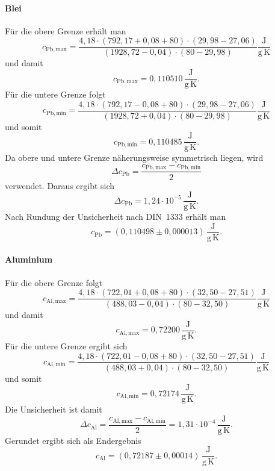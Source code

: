 \documentclass{report}
\begin{document}
\paragraph{Blei}
\noindent
Für die obere Grenze erhält man
\[
c_{\mathrm{Pb,max}}
=
\frac{
4{,}18
\cdot
(792{,}17+0{,}08+80)
\cdot
(29{,}98-27{,}06)
}{
(1928{,}72-0{,}04)
\cdot
(80-29{,}98)
}
\frac{\mathrm{J}}{\mathrm{g\,K}}
\]
\noindent
und damit
\[
c_{\mathrm{Pb,max}}
=
0{,}110510\,\frac{\mathrm{J}}{\mathrm{g\,K}}.
\]
\noindent
Für die untere Grenze folgt
\[
c_{\mathrm{Pb,min}}
=
\frac{
4{,}18
\cdot
(792{,}17-0{,}08+80)
\cdot
(29{,}98-27{,}06)
}{
(1928{,}72+0{,}04)
\cdot
(80-29{,}98)
}
\frac{\mathrm{J}}{\mathrm{g\,K}}
\]
\noindent
und somit
\[
c_{\mathrm{Pb,min}}
=
0{,}110485\,\frac{\mathrm{J}}{\mathrm{g\,K}}.
\]
\noindent
Da obere und untere Grenze näherungsweise symmetrisch liegen, wird
\[
\Delta c_\mathrm{Pb}
=
\frac{
c_{\mathrm{Pb,max}}-c_{\mathrm{Pb,min}}
}{2}
\]
\noindent
verwendet. Daraus ergibt sich
\[
\Delta c_\mathrm{Pb}
=
1{,}24\cdot10^{-5}
\,\frac{\mathrm{J}}{\mathrm{g\,K}}.
\]
\noindent
Nach Rundung der Unsicherheit nach DIN~1333 erhält man
\[
\boxed{
c_\mathrm{Pb}
=
(0{,}110498\pm0{,}000013)
\,\frac{\mathrm{J}}{\mathrm{g\,K}}
}.
\]


\paragraph{Aluminium}
\noindent
Für die obere Grenze folgt
\[
c_{\mathrm{Al,max}}
=
\frac{
4{,}18
\cdot
(722{,}01+0{,}08+80)
\cdot
(32{,}50-27{,}51)
}{
(488{,}03-0{,}04)
\cdot
(80-32{,}50)
}
\frac{\mathrm{J}}{\mathrm{g\,K}}
\]
\noindent
und damit
\[
c_{\mathrm{Al,max}}
=
0{,}72200\,\frac{\mathrm{J}}{\mathrm{g\,K}}.
\]
\noindent
Für die untere Grenze ergibt sich
\[
c_{\mathrm{Al,min}}
=
\frac{
4{,}18
\cdot
(722{,}01-0{,}08+80)
\cdot
(32{,}50-27{,}51)
}{
(488{,}03+0{,}04)
\cdot
(80-32{,}50)
}
\frac{\mathrm{J}}{\mathrm{g\,K}}
\]
\noindent
und somit
\[
c_{\mathrm{Al,min}}
=
0{,}72174\,\frac{\mathrm{J}}{\mathrm{g\,K}}.
\]
\noindent
Die Unsicherheit ist damit
\[
\Delta c_\mathrm{Al}
=
\frac{
c_{\mathrm{Al,max}}-c_{\mathrm{Al,min}}
}{2}
=
1{,}31\cdot10^{-4}
\,\frac{\mathrm{J}}{\mathrm{g\,K}}.
\]
\noindent
Gerundet ergibt sich als Endergebnis
\[
\boxed{
c_\mathrm{Al}
=
(0{,}72187\pm0{,}00014)
\,\frac{\mathrm{J}}{\mathrm{g\,K}}
}.
\]
\end{document}
